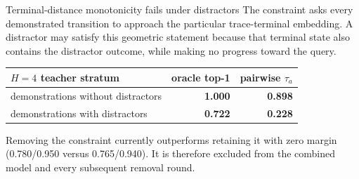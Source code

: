 \documentclass[aspectratio=169,10pt]{beamer}
\newcommand{\good}[1]{\textcolor{cgreen}{\textbf{#1}}}
\newcommand{\bad}[1]{\textcolor{cred}{\textbf{#1}}}
\begin{document}
\begin{frame}{Terminal-distance monotonicity fails under distractors}
\small
The constraint asks every demonstrated transition to approach the particular
trace-terminal embedding. A distractor may satisfy this geometric statement
because that terminal state also contains the distractor outcome, while making
no progress toward the query.

\medskip
\centering
\begin{tabular}{lrr}
\toprule
$H=4$ teacher stratum & oracle top-1 & pairwise $\tau_a$\\
\midrule
demonstrations without distractors & \good{1.000} & \good{0.898}\\
demonstrations with distractors & \bad{0.722} & \bad{0.228}\\
\bottomrule
\end{tabular}

\medskip
Removing the constraint currently outperforms retaining it with zero margin
(0.780/0.950 versus 0.765/0.940). It is therefore excluded from the combined
model and every subsequent removal round.
\end{frame}
\end{document}
